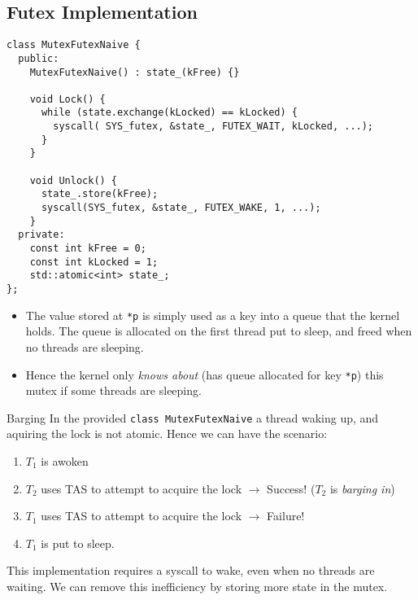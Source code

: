 \subsection{Futex Implementation}
\begin{verbatim}
class MutexFutexNaive {
  public:
    MutexFutexNaive() : state_(kFree) {}

    void Lock() {
      while (state.exchange(kLocked) == kLocked) {
        syscall( SYS_futex, &state_, FUTEX_WAIT, kLocked, ...);
      }
    }

    void Unlock() {
      state_.store(kFree);
      syscall(SYS_futex, &state_, FUTEX_WAKE, 1, ...);
    }
  private:
    const int kFree = 0;
    const int kLocked = 1;
    std::atomic<int> state_;
};
\end{verbatim}
\begin{itemize}
  \item The value stored at \texttt{*p} is simply used as a key into a queue that the kernel holds. The queue is allocated on the first thread put to sleep, and freed when no threads are sleeping.
  \item Hence the kernel only \textit{knows about} (has queue allocated for key \texttt{*p}) this mutex if some threads are sleeping.
\end{itemize}
\begin{definitionbox}{Barging}
  In the provided \texttt{class MutexFutexNaive} a thread waking up, and aquiring the lock is not atomic. Hence we can have the scenario:
  \begin{enumerate}
    \item $T_1$ is awoken
    \item $T_2$ uses TAS to attempt to acquire the lock $\to$ Success! ($T_2$ is \textit{barging in})
    \item $T_1$ uses TAS to attempt to acquire the lock $\to$ Failure!
    \item $T_1$ is put to sleep.
  \end{enumerate}
\end{definitionbox}
This implementation requires a syscall to wake, even when no threads are waiting. We can remove this inefficiency by storing more state in the mutex.
